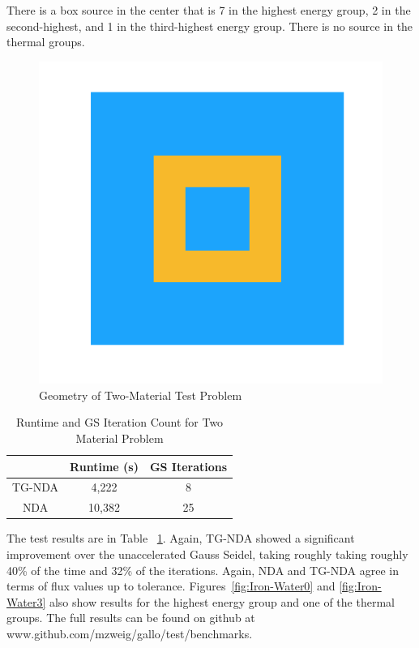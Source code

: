 There is a box source in the center that is 7 in the highest energy group, 2 in the second-highest, and 1 in the third-highest energy group. There is no source in the thermal groups.
\begin{figure}[H]
    \centering
    \includegraphics[width=.3\textwidth]{fig/Geometry.png}
    \caption{Geometry of Two-Material Test Problem}
    \label{fig:test_geometry}
\end{figure}

\begin{table}[!htb]
\centering
\caption{Runtime and GS Iteration Count for Two Material Problem}
    \label{tab:two}
\begin{center}
    \begin{tabular}{|c|c|c|}
    \hline
    & Runtime (s) & GS Iterations \\
    \hline
    TG-NDA & 4,222 & 8 \\
    NDA & 10,382 & 25 \\
    \hline
    \end{tabular}
\end{center}
\end{table}

The test results are in Table ~\ref{tab:two}. Again, TG-NDA showed a significant improvement over the unaccelerated Gauss Seidel, taking roughly taking roughly 40\% of the time and 32\% of the iterations. Again, NDA and TG-NDA agree in terms of flux values up to tolerance.  Figures~\ref{fig:Iron-Water0} and \ref{fig:Iron-Water3} also show results for the highest energy group and one of the thermal groups. The full results can be found on github at \\ www.github.com/mzweig/gallo/test/benchmarks.


